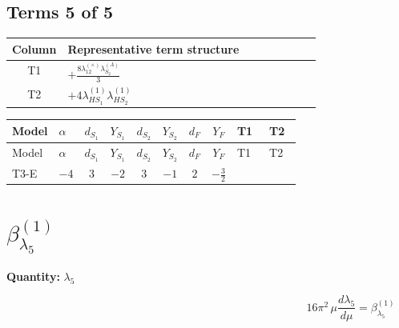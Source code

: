 \documentclass[8pt]{article}
\begin{document}
\begin{landscape}
\subsection*{Terms 5 of 5}
\begin{center}
\begin{tabular}{@{}c >{\raggedright\arraybackslash}p{0.82\linewidth}@{}}
\toprule
Column & Representative term structure \\
\midrule
T1 & \(\displaystyle +\frac{8 {\lambda_{12}^{(\times)}} {\lambda_{S_2}^{(A)}}}{3}\) \\
\midrule
T2 & \(\displaystyle +4 {\lambda_{HS_1}^{(1)}} {\lambda_{HS_2}^{(1)}}\) \\
\midrule
\bottomrule
\end{tabular}
\end{center}
\smallskip
\tiny
\begin{longtable}{@{}llcccccc >{\raggedright\arraybackslash}p{0.21\linewidth} >{\raggedright\arraybackslash}p{0.21\linewidth}@{}}
\toprule
Model & $\alpha$ & $d_{S_1}$ & $Y_{S_1}$ & $d_{S_2}$ & $Y_{S_2}$ & $d_F$ & $Y_F$ & T1 & T2 \\
\midrule
\endfirsthead
\toprule
Model & $\alpha$ & $d_{S_1}$ & $Y_{S_1}$ & $d_{S_2}$ & $Y_{S_2}$ & $d_F$ & $Y_F$ & T1 & T2 \\
\midrule
\endhead
T3-E & $-4$ & $3$ & $-2$ & $3$ & $-1$ & $2$ & $-\frac{3}{2}$ & \scriptsize\adjustbox{max width=\linewidth}{$\begin{gathered} +\frac{8 {\lambda_{12}^{(\times)}} {\lambda_{S_2}^{(A)}}}{3}\end{gathered}$} & \scriptsize\adjustbox{max width=\linewidth}{$\begin{gathered} +4 {\lambda_{HS_1}^{(1)}} {\lambda_{HS_2}^{(1)}}\end{gathered}$} \\
\midrule
\bottomrule
\end{longtable}
\clearpage
\section*{$\beta_{\lambda_5}^{(1)}$}
\noindent\textbf{Quantity: }$\lambda_5$\par\smallskip
\[16\pi^2\,\mu\frac{d \lambda_5}{d\mu}=\beta_{\lambda_5}^{(1)}\]

\end{landscape}
\end{document}
